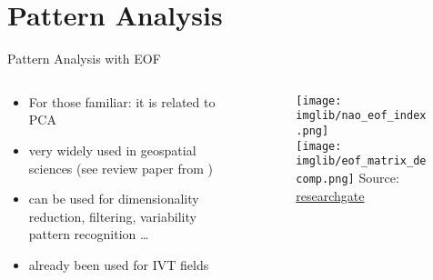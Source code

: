 \section{Pattern Analysis}

\begin{frame}{Pattern Analysis with EOF}
  \begin{columns}
    \begin{column}{.5\textwidth}
      \begin{itemize}
        \item For those familiar: it is related to PCA
        \item very widely used in geospatial sciences (see review paper from \citeauthor{hannachi_empirical_2007} \cite{hannachi_empirical_2007})
        \item can be used for dimensionality reduction, filtering, variability pattern recognition \dots
        \item already been used for IVT fields \cite{ayantobo_integrated_2022, salstein_modes_1983, jiang_water_2009}
      \end{itemize} 
      
    \end{column}
    \begin{column}{.5\textwidth}
    \begin{figure}[t]
      \centering
      \texttt{[image: imglib/nao\_eof\_index.png]}\\
      \texttt{[image: imglib/eof\_matrix\_decomp.png]}
      {\tiny Source: \href{https://www.researchgate.net/publication/357212141_Latest_Advances_in_Common_Signal_Processing_of_Pulsed_Thermography_for_Enhanced_Detectability_A_Review/figures?lo=1}{researchgate}}
    \end{figure}

    \end{column}
    
  \end{columns}
\end{frame}

